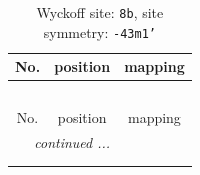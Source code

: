 \documentclass[fleqn,8pt]{jsarticle}
\begin{document}
\renewcommand{\arraystretch}{1.2}
\begin{longtable}{ccc}
\caption{Wyckoff site: {\tt 8b}, site symmetry: {\tt -43m1'}}
 \\
 \hline \hline
No. & position & mapping \\ \hline \endfirsthead

\multicolumn{2}{l}{\tablename\ \thetable{}} \\
 \hline \hline
No. & position & mapping \\ \hline \endhead

 \hline \hline
\multicolumn{2}{r}{\footnotesize\it continued ...} \\ \endfoot

 \hline \hline
\multicolumn{2}{r}{} \\ \endlastfoot


\end{longtable}
\end{document}
